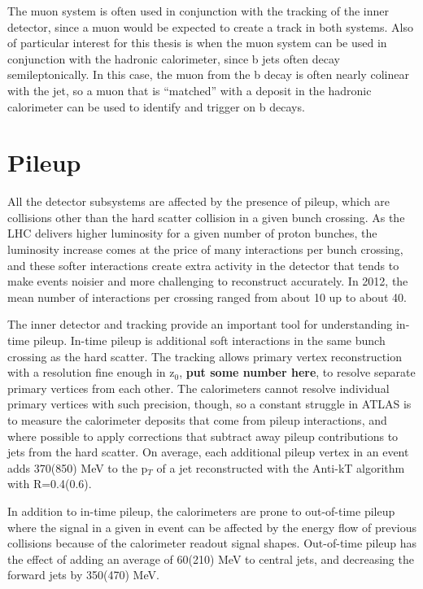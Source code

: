 \documentclass[11pt]{article}
\begin{document}
The muon system is often used in conjunction with the tracking of the inner detector, since a muon would be expected to create a track in both systems.  Also of particular interest for this thesis is when the muon system can be used in conjunction with the hadronic calorimeter, since b jets often decay semileptonically.  In this case, the muon from the b decay is often nearly colinear with the jet, so a muon that is ``matched'' with a deposit in the hadronic calorimeter can be used to identify and trigger on b decays.  



\section{Pileup}
All the detector subsystems are affected by the presence of pileup, which are collisions other than the hard scatter collision in a given bunch crossing.  As the LHC delivers higher luminosity for a given number of proton bunches, the luminosity increase comes at the price of many interactions per bunch crossing, and these softer interactions create extra activity in the detector that tends to make events noisier and more challenging to reconstruct accurately.  In 2012, the mean number of interactions per crossing ranged from about 10 up to about 40.  

The inner detector and tracking provide an important tool for understanding in-time pileup.  In-time pileup is additional soft interactions in the same bunch crossing as the hard scatter.  The tracking allows primary vertex reconstruction with a resolution fine enough in z$_0$, \textbf{put some number here}, to resolve separate primary vertices from each other.   The calorimeters cannot resolve individual primary vertices with such precision, though, so a constant struggle in ATLAS is to measure the calorimeter deposits that come from pileup interactions, and where possible to apply corrections that subtract away pileup contributions to jets from the hard scatter.  On average, each additional pileup vertex in an event adds 370(850) MeV to the p$_T$ of a jet reconstructed with the Anti-kT algorithm with R=0.4(0.6).

In addition to in-time pileup, the calorimeters are prone to out-of-time pileup where the signal in a given in event can be affected by the energy flow of previous collisions because of the calorimeter readout signal shapes.  Out-of-time pileup has the effect of adding an average of 60(210) MeV to central jets, and decreasing the forward jets by 350(470) MeV.  
\end{document}
